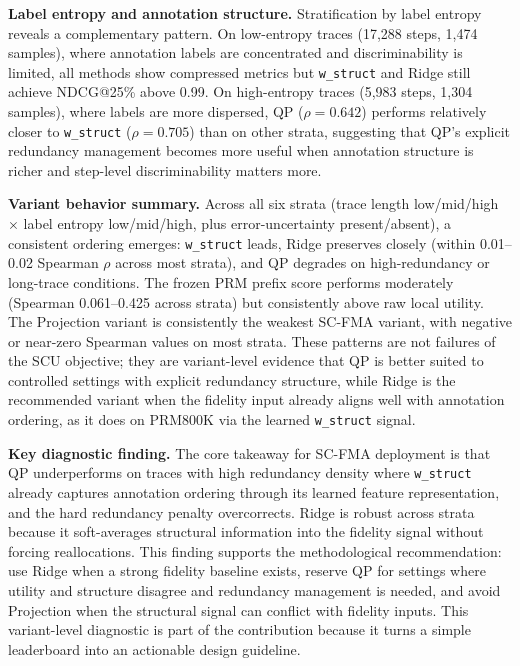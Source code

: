 \documentclass[a4paper,fleqn]{cas-sc}
\begin{document}
\medskip
\noindent\textbf{Label entropy and annotation structure.} Stratification by label entropy reveals a complementary pattern. On low-entropy traces (17,288 steps, 1,474 samples), where annotation labels are concentrated and discriminability is limited, all methods show compressed metrics but \texttt{w\_struct} and Ridge still achieve NDCG@25\% above 0.99. On high-entropy traces (5,983 steps, 1,304 samples), where labels are more dispersed, QP ($\rho=0.642$) performs relatively closer to \texttt{w\_struct} ($\rho=0.705$) than on other strata, suggesting that QP's explicit redundancy management becomes more useful when annotation structure is richer and step-level discriminability matters more.

\medskip
\noindent\textbf{Variant behavior summary.} Across all six strata (trace length low/mid/high $\times$ label entropy low/mid/high, plus error-uncertainty present/absent), a consistent ordering emerges: \texttt{w\_struct} leads, Ridge preserves closely (within 0.01--0.02 Spearman $\rho$ across most strata), and QP degrades on high-redundancy or long-trace conditions. The frozen PRM prefix score performs moderately (Spearman 0.061--0.425 across strata) but consistently above raw local utility. The Projection variant is consistently the weakest SC-FMA variant, with negative or near-zero Spearman values on most strata. These patterns are not failures of the SCU objective; they are variant-level evidence that QP is better suited to controlled settings with explicit redundancy structure, while Ridge is the recommended variant when the fidelity input already aligns well with annotation ordering, as it does on PRM800K via the learned \texttt{w\_struct} signal.

\medskip
\noindent\textbf{Key diagnostic finding.} The core takeaway for SC-FMA deployment is that QP underperforms on traces with high redundancy density where \texttt{w\_struct} already captures annotation ordering through its learned feature representation, and the hard redundancy penalty overcorrects. Ridge is robust across strata because it soft-averages structural information into the fidelity signal without forcing reallocations. This finding supports the methodological recommendation: use Ridge when a strong fidelity baseline exists, reserve QP for settings where utility and structure disagree and redundancy management is needed, and avoid Projection when the structural signal can conflict with fidelity inputs. This variant-level diagnostic is part of the contribution because it turns a simple leaderboard into an actionable design guideline.
\end{document}
